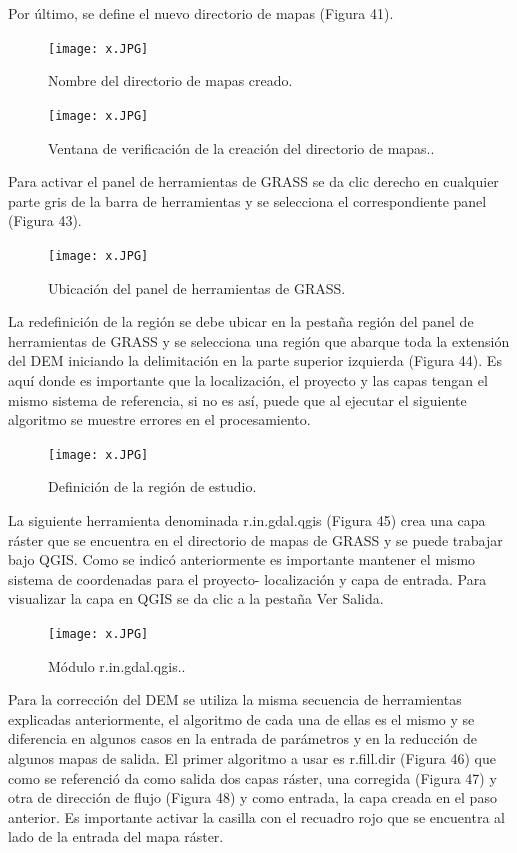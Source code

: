 \documentclass[12pt,hidelinks]{article}
\begin{document}
Por último, se define el nuevo directorio de mapas (Figura 41).
\begin{figure}[H]
    \centering
    \texttt{[image: x.JPG]}
    \caption{   Nombre del directorio de mapas creado.}
 \label{fig:my_label}
\end{figure}
\begin{figure}[H]
    \centering
    \texttt{[image: x.JPG]}
    \caption{   Ventana de verificación de la creación del directorio de mapas..}
 \label{fig:my_label}
\end{figure}
Para activar el panel de herramientas de GRASS se da clic derecho en cualquier parte gris de la barra de herramientas y se selecciona el correspondiente panel (Figura 43).
\begin{figure}[H]
    \centering
    \texttt{[image: x.JPG]}
    \caption{   Ubicación del panel de herramientas de GRASS.}
 \label{fig:my_label}
\end{figure}
La redefinición de la región se debe ubicar en la pestaña región del panel de herramientas de GRASS y se selecciona una región que abarque toda la extensión del DEM iniciando la delimitación en la parte superior izquierda (Figura 44). Es aquí donde es importante que la localización, el proyecto y las capas tengan el mismo sistema de referencia, si no es así, puede que al ejecutar el siguiente algoritmo se muestre errores en el procesamiento.
\begin{figure}[H]
    \centering
    \texttt{[image: x.JPG]}
    \caption{   Definición de la región de estudio.}
 \label{fig:my_label}
\end{figure}
La siguiente herramienta denominada r.in.gdal.qgis (Figura 45) crea una capa ráster que se encuentra en el directorio de mapas de GRASS y se puede trabajar bajo QGIS. Como se indicó anteriormente es importante mantener el mismo sistema de coordenadas para el proyecto- localización y capa de entrada. Para visualizar la capa en QGIS se da clic a la pestaña Ver Salida.
\begin{figure}[H]
    \centering
    \texttt{[image: x.JPG]}
    \caption{   Módulo r.in.gdal.qgis..}
 \label{fig:my_label}
\end{figure}
Para la corrección del DEM se utiliza la misma secuencia de herramientas explicadas anteriormente, el algoritmo de cada una de ellas es el mismo y se diferencia en algunos casos en la entrada de parámetros y en la reducción de algunos mapas de salida. El primer algoritmo a usar es r.fill.dir (Figura 46) que como se referenció da como salida dos capas ráster, una corregida (Figura 47) y otra de dirección de flujo (Figura 48) y como entrada, la capa creada en el paso anterior. Es importante activar la casilla con el recuadro rojo que se encuentra al lado de la entrada del mapa ráster.
\end{document}
